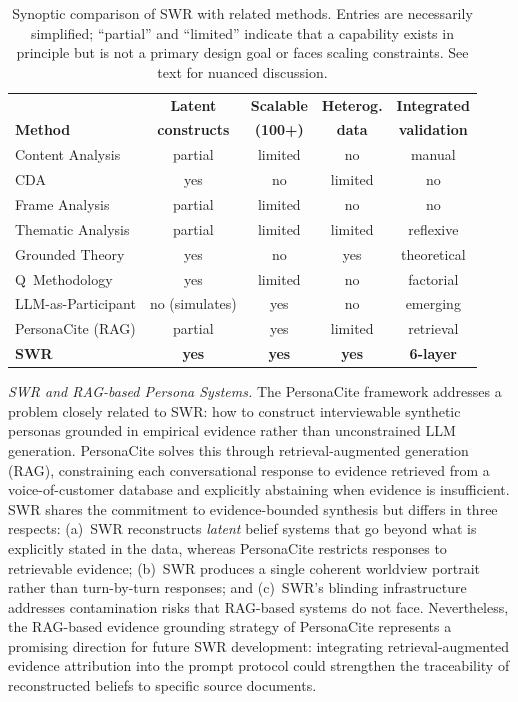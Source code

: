 \documentclass[11pt,a4paper]{article}
\theoremstyle{definition}
\theoremstyle{plain}
\theoremstyle{remark}
\begin{document}
\begin{table}[ht]
\centering
\small
\caption{Synoptic comparison of SWR with related methods. Entries are necessarily simplified; ``partial'' and ``limited'' indicate that a capability exists in principle but is not a primary design goal or faces scaling constraints. See text for nuanced discussion.}
\label{tab:method_comparison}
\begin{tabular}{lcccc}
\toprule
 & \textbf{Latent} & \textbf{Scalable} & \textbf{Heterog.} & \textbf{Integrated} \\
\textbf{Method} & \textbf{constructs} & \textbf{(100+)} & \textbf{data} & \textbf{validation} \\
\midrule
Content Analysis & partial & limited & no & manual \\
CDA & yes & no & limited & no \\
Frame Analysis & partial & limited & no & no \\
Thematic Analysis & partial & limited & limited & reflexive \\
Grounded Theory & yes & no & yes & theoretical \\
Q~Methodology & yes & limited & no & factorial \\
LLM-as-Participant & no (simulates) & yes & no & emerging \\
PersonaCite (RAG) & partial & yes & limited & retrieval \\
\textbf{SWR} & \textbf{yes} & \textbf{yes} & \textbf{yes} & \textbf{6-layer} \\
\bottomrule
\end{tabular}
\end{table}

\emph{SWR and RAG-based Persona Systems.} The PersonaCite framework \citep{PersonaCite2026} addresses a problem closely related to SWR: how to construct interviewable synthetic personas grounded in empirical evidence rather than unconstrained LLM generation. PersonaCite solves this through retrieval-augmented generation (RAG), constraining each conversational response to evidence retrieved from a voice-of-customer database and explicitly abstaining when evidence is insufficient. SWR shares the commitment to evidence-bounded synthesis but differs in three respects: (a)~SWR reconstructs \emph{latent} belief systems that go beyond what is explicitly stated in the data, whereas PersonaCite restricts responses to retrievable evidence; (b)~SWR produces a single coherent worldview portrait rather than turn-by-turn responses; and (c)~SWR's blinding infrastructure addresses contamination risks that RAG-based systems do not face. Nevertheless, the RAG-based evidence grounding strategy of PersonaCite represents a promising direction for future SWR development: integrating retrieval-augmented evidence attribution into the prompt protocol could strengthen the traceability of reconstructed beliefs to specific source documents.
\end{document}
